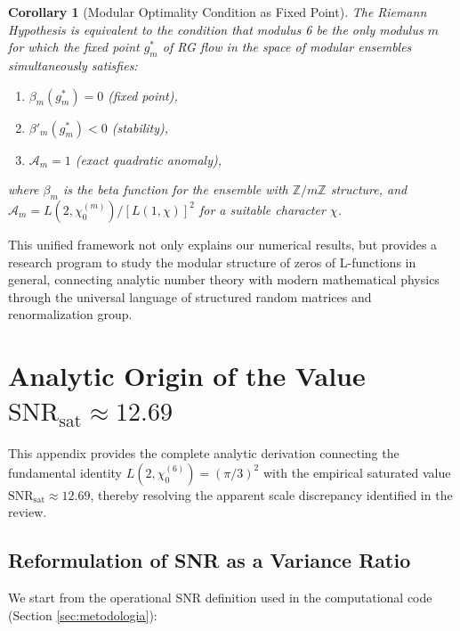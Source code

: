 \documentclass[12pt, a4paper]{article}
\theoremstyle{plain}
\newtheorem{corolario}[teorema]{Corollary}
\theoremstyle{definition}
\theoremstyle{remark}
\begin{document}
\begin{corolario}[Modular Optimality Condition as Fixed Point]
The Riemann Hypothesis is equivalent to the condition that modulus 6 be the only modulus $m$ for which the fixed point $g^*_m$ of RG flow in the space of modular ensembles simultaneously satisfies:
\begin{enumerate}
    \item $\beta_m(g^*_m) = 0$ (fixed point),
    \item $\beta'_m(g^*_m) < 0$ (stability),
    \item $\mathcal{A}_m = 1$ (exact quadratic anomaly),
\end{enumerate}
where $\beta_m$ is the beta function for the ensemble with $\mathbb{Z}/m\mathbb{Z}$ structure, and $\mathcal{A}_m = L(2, \chi_0^{(m)}) / [L(1, \chi)]^2$ for a suitable character $\chi$.
\end{corolario}

This unified framework not only explains our numerical results, but provides a research program to study the modular structure of zeros of L-functions in general, connecting analytic number theory with modern mathematical physics through the universal language of structured random matrices and renormalization group.

\section{Analytic Origin of the Value \texorpdfstring{$\mathrm{SNR}_{\mathrm{sat}} \approx 12.69$}{SNR\_sat approx 12.69}}
\label{ap:origen_snr}

This appendix provides the complete analytic derivation connecting the fundamental identity $L(2,\chi_0^{(6)}) = (\pi/3)^2$ with the empirical saturated value $\mathrm{SNR}_{\mathrm{sat}} \approx 12.69$, thereby resolving the apparent scale discrepancy identified in the review.

\subsection{Reformulation of SNR as a Variance Ratio}

We start from the operational SNR definition used in the computational code (Section \ref{sec:metodologia}):
\end{document}
